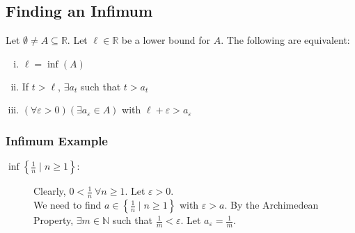 \documentclass[10pt]{extarticle}
\newcommand{\N}{\mathbb{N}}
\newcommand{\R}{\mathbb{R}}
\begin{document}
    \subsection{Finding an Infimum}%
    Let $\emptyset \neq A \subseteq \R$. Let $\ell \in \R$ be a lower bound for $A$. The following are equivalent:
    \begin{enumerate}[(i)]
      \item $\ell = \inf(A)$
      \item If $t > \ell$, $\exists a_t$ such that $t > a_t$
      \item $(\forall \varepsilon > 0)(\exists a_{\varepsilon}\in A)$ with $\ell + \varepsilon > a_{\varepsilon}$
    \end{enumerate}
    \subsubsection{Infimum Example}%
    \begin{description}
      \item[$\inf\left\{\frac{1}{n}\mid n\geq 1\right\}:$] Clearly, $0 < \frac{1}{n}~\forall n \geq 1$. Let $\varepsilon > 0$.\\

        We need to find $a\in\left\{\frac{1}{n}\mid n\geq 1\right\}$ with $\varepsilon > a$. By the Archimedean Property, $\exists m\in\N$ such that $\frac{1}{m} < \varepsilon$. Let $a_{\varepsilon} = \frac{1}{m}$.
    \end{description}
\end{document}
